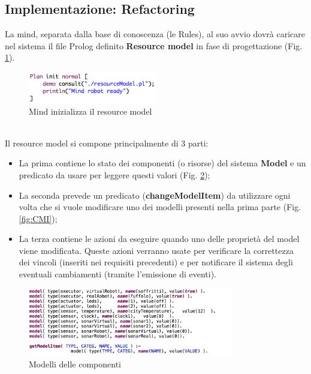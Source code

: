 \documentclass{llncs}
\begin{document}
\subsection{Implementazione: Refactoring}
\label{ImplementazioneRefReq4}
La mind, separata dalla base di conoscenza (le Rules), al suo avvio dovr\`a caricare nel sistema il file Prolog definito \textbf{Resource model} in fase di progettazione (Fig. \hyperref[fig:MindConsultRMReq4]{\ref{fig:MindConsultRMReq4}}).
\\
\begin{figure}
    \centering
    \includegraphics[width=0.5\textwidth]{Immagini/Requisito4/ResourceModelConsult.png}
    \caption{Mind inizializza il resource model}
    \label{fig:MindConsultRMReq4}
\end{figure}
\vspace*{1ex}
\\
Il resource model si compone principalmente di 3 parti:
\begin{itemize}
    \item La prima contiene lo stato dei componenti (o risorse) del sistema \textbf{Model} e un predicato da usare per leggere questi valori (Fig. \hyperref[fig:ModComp]{\ref{fig:ModComp}});
    \item La seconda prevede un predicato (\textbf{changeModelItem}) da utilizzare ogni volta che si vuole modificare uno dei modelli presenti nella prima parte (Fig. \hyperref[fig:CMI]{\ref{fig:CMI}});
    \item La terza contiene le azioni da eseguire quando uno delle propriet\`a del model viene modificata. Queste azioni verranno usate per verificare la correttezza dei vincoli (inseriti nei requisiti precedenti) e per notificare il sistema degli eventuali cambiamenti (tramite l'emissione di eventi).
\end{itemize}
\begin{figure}
    \centering
    \includegraphics[width=0.8\textwidth]{Immagini/Requisito4/modelliResModReq4.png}
    \caption{Modelli delle componenti}
    \label{fig:ModComp}
\end{figure}
\vspace*{1ex}
\end{document}
